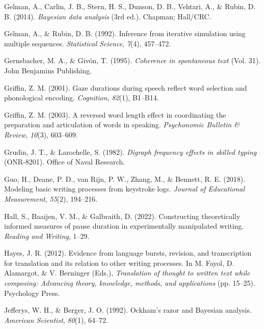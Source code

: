 \documentclass[
  man,floatsintext]{apa7}
\newlength{\cslhangindent}
\newlength{\cslentryspacingunit} %
\newenvironment{CSLReferences}[2] %
 {%
  \setlength{\parindent}{0pt}
  \ifodd #1
  \let\oldpar\par
  \def\par{\hangindent=\cslhangindent\oldpar}
  \fi
  \setlength{\parskip}{#2\cslentryspacingunit}
 }%
 {}
\begin{document}
\begin{CSLReferences}{1}{0}
\leavevmode{}%
Gelman, A., Carlin, J. B., Stern, H. S., Dunson, D. B., Vehtari, A., \& Rubin, D. B. (2014). \emph{Bayesian data analysis} (3rd ed.). Chapman; Hall/CRC.

\leavevmode{}%
Gelman, A., \& Rubin, D. B. (1992). Inference from iterative simulation using multiple sequences. \emph{Statistical Science}, \emph{7}(4), 457--472.

\leavevmode{}%
Gernsbacher, M. A., \& Givón, T. (1995). \emph{Coherence in spontaneous text} (Vol. 31). John Benjamins Publishing.

\leavevmode{}%
Griffin, Z. M. (2001). Gaze durations during speech reflect word selection and phonological encoding. \emph{Cognition}, \emph{82}(1), B1--B14.

\leavevmode{}%
Griffin, Z. M. (2003). A reversed word length effect in coordinating the preparation and articulation of words in speaking. \emph{Psychonomic Bulletin \& Review}, \emph{10}(3), 603--609.

\leavevmode{}%
Grudin, J. T., \& Larochelle, S. (1982). \emph{Digraph frequency effects in skilled typing} (ONR-8201). Office of Naval Research.

\leavevmode{}%
Guo, H., Deane, P. D., van Rijn, P. W., Zhang, M., \& Bennett, R. E. (2018). Modeling basic writing processes from keystroke logs. \emph{Journal of Educational Measurement}, \emph{55}(2), 194--216.

\leavevmode{}%
Hall, S., Baaijen, V. M., \& Galbraith, D. (2022). Constructing theoretically informed measures of pause duration in experimentally manipulated writing. \emph{Reading and Writing}, 1--29.

\leavevmode{}%
Hayes, J. R. (2012). Evidence from language bursts, revision, and transcription for translation and its relation to other writing processes. In M. Fayol, D. Alamargot, \& V. Berninger (Eds.), \emph{Translation of thought to written text while composing: Advancing theory, knowledge, methods, and applications} (pp. 15--25). Psychology Press.

\leavevmode{}%
Jefferys, W. H., \& Berger, J. O. (1992). Ockham's razor and {B}ayesian analysis. \emph{American Scientist}, \emph{80}(1), 64--72.


\end{CSLReferences}
\end{document}
